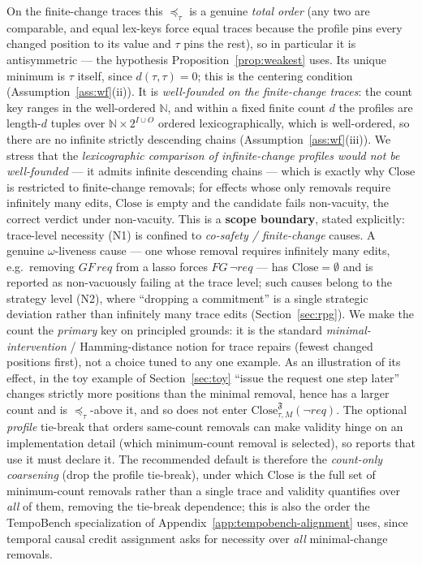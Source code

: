 \documentclass[11pt]{article}
\theoremstyle{remark}
\newcommand{\Close}{\mathrm{Close}}
\newcommand{\Nat}{\mathbb{N}}
\newcommand{\Frame}{\mathfrak{F}}
\begin{document}
On the finite-change traces this \(\preceq_\tau\) is a genuine \emph{total order}
(any two are comparable, and equal lex-keys force equal traces because the profile
pins every changed position to its value and \(\tau\) pins the rest), so in
particular it is antisymmetric --- the hypothesis Proposition~\ref{prop:weakest}
uses. Its unique minimum is \(\tau\) itself, since \(d(\tau,\tau)=0\); this is the
centering condition (Assumption~\ref{ass:wf}(ii)). It is \emph{well-founded on the
finite-change traces}: the count key ranges in the well-ordered
\(\Nat\), and within a fixed finite count \(d\) the profiles are length-\(d\)
tuples over \(\Nat\times 2^{I\cup O}\) ordered lexicographically, which is
well-ordered, so there are no infinite strictly descending chains
(Assumption~\ref{ass:wf}(iii)). We stress that the \emph{lexicographic comparison
of infinite-change profiles would not be well-founded} --- it admits infinite
descending chains --- which is exactly why \(\Close\) is restricted to
finite-change removals; for effects whose only removals require infinitely many
edits, \(\Close\) is empty and the candidate fails non-vacuity, the correct
verdict under non-vacuity. This is a \textbf{scope boundary}, stated explicitly:
trace-level necessity (N1) is confined to \emph{co-safety / finite-change} causes.
A genuine \(\omega\)-liveness cause --- one whose removal requires infinitely many
edits, e.g.\ removing \(GF\,req\) from a lasso forces \(FG\,\neg req\) --- has
\(\Close=\emptyset\) and is reported as non-vacuously failing at the trace level;
such causes belong to the strategy level (N2), where ``dropping a commitment'' is
a single strategic deviation rather than infinitely many trace edits
(Section~\ref{sec:rpg}). We make the count the \emph{primary} key on principled grounds: it is the standard
\emph{minimal-intervention} / Hamming-distance notion for trace repairs (fewest
changed positions first), not a choice tuned to any one example. As an
illustration of its effect, in the toy example of
Section~\ref{sec:toy} ``issue the request one step later''
changes strictly more positions than the minimal removal, hence has a larger
count and is \(\preceq_\tau\)-above it, and so does not enter
\(\Close_{\tau,M}^{\Frame}(\neg req)\). The optional \emph{profile} tie-break that
orders same-count removals can make validity hinge on an implementation detail
(which minimum-count removal is selected), so reports that use it must declare it.
The recommended default is therefore the \emph{count-only coarsening} (drop the
profile tie-break), under which \(\Close\) is the full set of minimum-count
removals rather than a single trace and validity quantifies over \emph{all} of
them, removing the tie-break dependence; this is also the order the TempoBench
specialization of Appendix~\ref{app:tempobench-alignment} uses, since temporal
causal credit assignment asks for necessity over \emph{all} minimal-change
removals.
\end{document}
